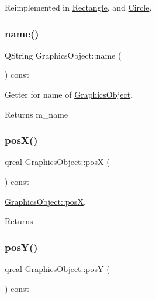 Reimplemented in \hyperlink{class_rectangle_a6d2cdec338bb43ad533b98e58eea9e03}{Rectangle}, and \hyperlink{class_circle_ad1fa0a922709e61b3e70eef604a3600d}{Circle}.

\mbox{\label{class_graphics_object_ac5591ff2b8009451c593d1197ce7a162}} 
\subsubsection{\texorpdfstring{name()}{name()}}
{\footnotesize\ttfamily Q\+String Graphics\+Object\+::name (\begin{DoxyParamCaption}{ }\end{DoxyParamCaption}) const}



Getter for name of \hyperlink{class_graphics_object}{Graphics\+Object}. 

\begin{DoxyReturn}{Returns}
m\+\_\+name 
\end{DoxyReturn}
\mbox{\label{class_graphics_object_a0141eaaf7ab936a2630183c403257026}} 
\subsubsection{\texorpdfstring{pos\+X()}{posX()}}
{\footnotesize\ttfamily qreal Graphics\+Object\+::posX (\begin{DoxyParamCaption}{ }\end{DoxyParamCaption}) const}



\hyperlink{class_graphics_object_a0141eaaf7ab936a2630183c403257026}{Graphics\+Object\+::posX}. 

\begin{DoxyReturn}{Returns}

\end{DoxyReturn}
\mbox{\label{class_graphics_object_adfd441f0d80339456482cc71355ba429}} 
\subsubsection{\texorpdfstring{pos\+Y()}{posY()}}
{\footnotesize\ttfamily qreal Graphics\+Object\+::posY (\begin{DoxyParamCaption}{ }\end{DoxyParamCaption}) const}



